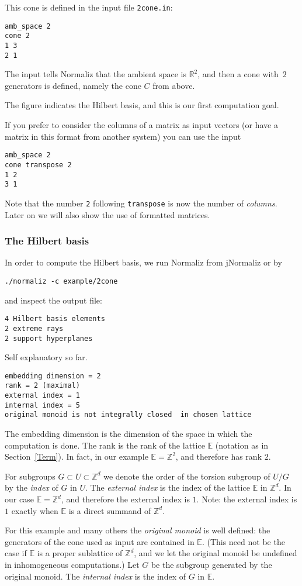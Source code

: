 \documentclass[12pt,a4paper]{scrartcl}
\theoremstyle{definition}
\def\ZZ{{\mathbb Z}}
\def\RR{{\mathbb R}}
\def\EE{{\mathbb E}}
\begin{document}
This cone is defined in the input file \verb|2cone.in|:
\begin{Verbatim}
amb_space 2
cone 2
1 3
2 1
\end{Verbatim}
The input tells Normaliz that the ambient space is $\RR^2$, and then a cone with~$2$ generators is defined, namely the cone $C$ from above.

The figure indicates the Hilbert basis, and this is our first computation goal.

If you prefer to consider the columns of a matrix as input vectors (or have a matrix in this format from another system) you can use the input
\begin{Verbatim}
amb_space 2
cone transpose 2
1 2
3 1
\end{Verbatim}
Note that the number \verb|2| following \verb|transpose| is now the number of \emph{columns}. Later on we will also show the use of formatted matrices.

\subsubsection{The Hilbert basis}
In order to compute the Hilbert basis, we run Normaliz from jNormaliz or by
\begin{Verbatim}
./normaliz -c example/2cone
\end{Verbatim}
and inspect the output file:
\begin{Verbatim}
4 Hilbert basis elements
2 extreme rays
2 support hyperplanes
\end{Verbatim}
Self explanatory so far.
\begin{Verbatim}
embedding dimension = 2
rank = 2 (maximal)
external index = 1
internal index = 5
original monoid is not integrally closed  in chosen lattice
\end{Verbatim}
The embedding dimension is the dimension of the space in which the computation is done. The rank is the rank of the lattice $\EE$ (notation as in Section~\ref{Term}). In fact, in our example $\EE=\ZZ^2$, and therefore has rank $2$.

For subgroups $G\subset U\subset \ZZ^d$ we denote the order of the torsion subgroup of $U/G$ by the \emph{index} of $G$ in $U$. The \emph{external index} is the index of the lattice $\EE$ in $\ZZ^d$. In our case $\EE=\ZZ^d$, and therefore the external index is $1$. Note: the external index is $1$ exactly when $\EE$ is a direct summand of $\ZZ^d$.

For this example and many others the \emph{original monoid} is well defined: the generators of the cone used as input are contained in $\EE$. (This need not be the case if $\EE$ is a proper sublattice of $\ZZ^d$, and we let the original monoid be undefined in inhomogeneous computations.) Let $G$ be the subgroup generated by the original monoid. The \emph{internal index} is the index of $G$ in $\EE$.
\end{document}
